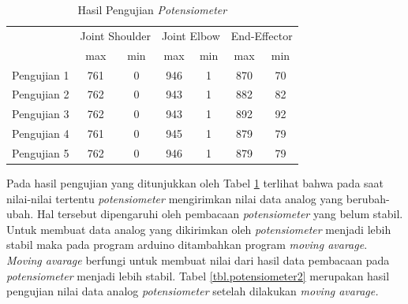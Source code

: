 \begin{table}[H]
	\centering
	\caption{Hasil Pengujian \textit{Potensiometer}}
	\label{tbl.potensiometer}
	\begin{tabular}{|c|c|c|c|c|c|c|}
		\hline
		\rowcolor[HTML]{9B9B9B} 
		\cellcolor[HTML]{9B9B9B}                            & \multicolumn{2}{c|}{\cellcolor[HTML]{9B9B9B}Joint Shoulder} & \multicolumn{2}{c|}{\cellcolor[HTML]{9B9B9B}Joint Elbow} & \multicolumn{2}{c|}{\cellcolor[HTML]{9B9B9B}End-Effector} \\ \cline{2-7} 
		\rowcolor[HTML]{9B9B9B} 
		\multirow{-2}{*}{\cellcolor[HTML]{9B9B9B}Pengujian} & max                          & min                          & max                         & min                        & max                         & min                         \\ \hline
		Pengujian 1                                         & 761                          & 0                            & 946                         & 1                          & 870                         & 70                          \\ \hline
		Pengujian 2                                         & 762                          & 0                            & 943                         & 1                          & 882                         & 82                          \\ \hline
		Pengujian 3                                         & 762                          & 0                            & 943                         & 1                          & 892                         & 92                          \\ \hline
		Pengujian 4                                         & 761                          & 0                            & 945                         & 1                          & 879                         & 79                          \\ \hline
		Pengujian 5                                         & 762                          & 0                            & 946                         & 1                          & 879                         & 79                          \\ \hline
	\end{tabular}
\end{table} 

Pada hasil pengujian yang ditunjukkan oleh Tabel \ref{tbl.potensiometer} terlihat bahwa pada saat nilai-nilai tertentu \textit{potensiometer}  mengirimkan nilai data analog yang berubah-ubah. Hal tersebut dipengaruhi oleh pembacaan \textit{potensiometer} yang belum stabil. Untuk membuat data analog yang dikirimkan oleh \textit{potensiometer} menjadi lebih stabil maka pada program arduino ditambahkan program \textit{moving avarage}. \textit{Moving avarage} berfungi untuk membuat nilai dari hasil data pembacaan pada \textit{potensiometer} menjadi lebih stabil. Tabel \ref{tbl.potensiometer2} merupakan hasil pengujian nilai data analog \textit{potensiometer} setelah dilakukan \textit{moving avarage.}

